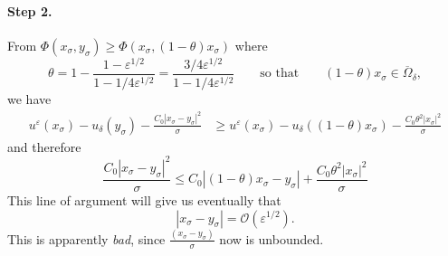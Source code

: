 \documentclass[11pt,reqno]{amsart}
\numberwithin{figure}{section}
\theoremstyle{plain}
\theoremstyle{remark}
\numberwithin{equation}{section}
\begin{document}
\paragraph{Step 2.} From $\Phi(x_\sigma,y_\sigma)\geq \Phi(x_\sigma,(1-\theta)x_\sigma)$ where
\begin{equation*}
    \theta = 1-\frac{1-\varepsilon^{1/2}}{1-1/4\varepsilon^{1/2}} = \frac{3/4\varepsilon^{1/2}}{1-1/4\varepsilon^{1/2}} \qquad\text{so that}\qquad (1-\theta) x_\sigma \in \overline{\Omega}_\delta,
\end{equation*}
we have
\begin{align*}
     u^\varepsilon(x_\sigma) - u_\delta(y_\sigma) - \frac{C_0|x_\sigma - y_\sigma|^2}{\sigma}  &\geq u^\varepsilon(x_\sigma) - u_\delta((1-\theta)x_\sigma)  - \frac{C_0\theta^2|x_\sigma|^2}{\sigma}
\end{align*}
and therefore
\begin{equation*}
    \frac{C_0|x_\sigma - y_\sigma|^2}{\sigma} \leq C_0|(1-\theta)x_\sigma - y_\sigma| + \frac{C_0\theta^2 |x_\sigma|^2}{\sigma}
\end{equation*}
This line of argument will give us eventually that
\begin{equation*}
    |x_\sigma - y_\sigma| = \mathcal{O}\left(\varepsilon^{1/2}\right).
\end{equation*}
This is apparently \emph{bad}, since $\frac{(x_\sigma - y_\sigma)}{\sigma}$ now is unbounded.
\end{document}
